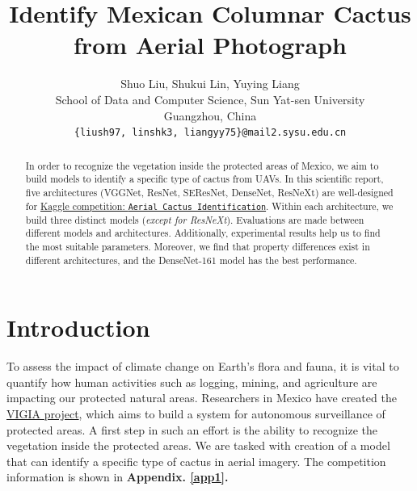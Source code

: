 \documentclass[10pt,twocolumn,letterpaper]{article}
\begin{document}
\title{Identify Mexican Columnar Cactus from Aerial Photograph}

\author{Shuo Liu, Shukui Lin, Yuying Liang\\
School of Data and Computer Science, Sun Yat-sen University\\
Guangzhou, China\\
{\tt\small \{liush97, linshk3, liangyy75\}@mail2.sysu.edu.cn}
}

\maketitle

\begin{abstract}
   In order to recognize the vegetation inside the protected areas of Mexico, we aim to build models to identify a specific type of cactus from UAVs. In this scientific report, five architectures (\textsf{VGGNet}, \textsf{ResNet}, \textsf{SEResNet}, \textsf{DenseNet}, \textsf{ResNeXt}) are well-designed for \href{https://www.kaggle.com/c/aerial-cactus-identification}{Kaggle competition: \texttt{Aerial Cactus Identification}}. Within each architecture, we build three distinct models (\textit{except for \textsf{ResNeXt}}). Evaluations are made between different models and architectures. Additionally, experimental results help us to find the most suitable parameters. Moreover, we find that property differences exist in different architectures, and the \textsf{DenseNet-161} model has the best performance.
\end{abstract}

\section{Introduction} \label{SECintro}

To assess the impact of climate change on Earth's flora and fauna, it is vital to quantify how human activities such as logging, mining, and agriculture are impacting our protected natural areas. Researchers in Mexico have created the \href{https://jivg.org/research-projects/vigia/}{VIGIA project}, which aims to build a system for autonomous surveillance of protected areas. A first step in such an effort is the ability to recognize the vegetation inside the protected areas. We are tasked with creation of a model that can identify a specific type of cactus in aerial imagery. The competition information is shown in \textbf{Appendix. \ref{app1}.}
\end{document}
